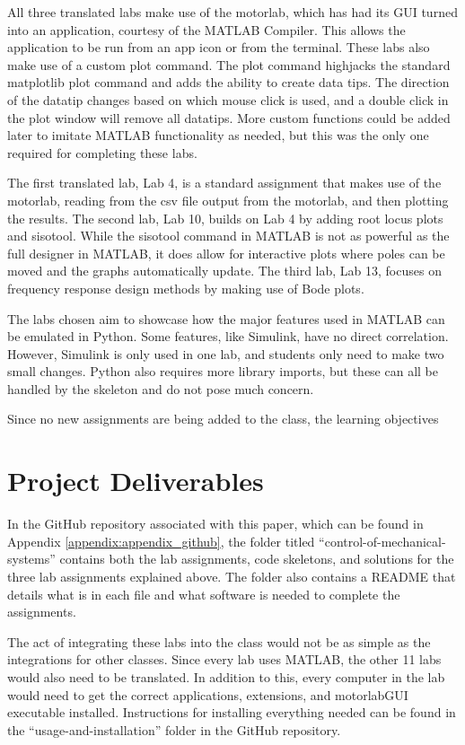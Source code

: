 All three translated labs make use of the motorlab, which has had its GUI turned into an application, courtesy of the MATLAB
Compiler. This allows the application to be run from an app icon or from the terminal. These labs also make use of a custom plot
command. The plot command highjacks the standard matplotlib plot command and adds the ability to create data tips. The
direction of the datatip changes based on which mouse click is used, and a double click in the plot window will remove all datatips.
More custom functions could be added later to imitate MATLAB functionality as needed, but this was the only one required for
completing these labs.

The first translated lab, Lab 4, is a standard assignment that makes use of the motorlab, reading from the csv file output from the
motorlab, and then plotting the results. The second lab, Lab 10, builds on Lab 4 by adding root locus plots and sisotool. While the
sisotool command in MATLAB is not as powerful as the full designer in MATLAB, it does allow for interactive plots where poles can
be moved and the graphs automatically update. The third lab, Lab 13, focuses on frequency response design methods by making use
of Bode plots.

The labs chosen aim to showcase how the major features used in MATLAB can be emulated in Python. Some features, like Simulink, have
no direct correlation. However, Simulink is only used in one lab, and students only need to make two small changes. Python also
requires more library imports, but these can all be handled by the skeleton and do not pose much concern.

Since no new assignments are being added to the class, the learning objectives 

\section{Project Deliverables}

In the GitHub repository associated with this paper, which can be found in Appendix \ref{appendix:appendix_github},
the folder titled ``control-of-mechanical-systems'' contains both the lab assignments, code skeletons, and solutions for the three
lab assignments explained above. The folder also contains a README that details what is in each file and what software is needed 
to complete the assignments. 

The act of integrating these labs into the class would not be as simple as the integrations for other classes. Since every lab 
uses MATLAB, the other 11 labs would also need to be translated. In addition to this, every computer in the lab would need to 
get the correct applications, extensions, and motorlabGUI executable installed. Instructions for installing everything needed 
can be found in the ``usage-and-installation'' folder in the GitHub repository.
